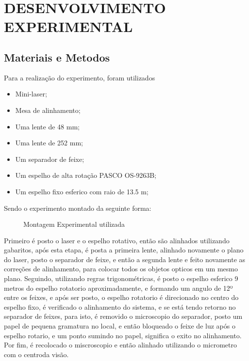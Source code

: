 \section{DESENVOLVIMENTO EXPERIMENTAL}
\subsection{Materiais e Metodos}
Para a realização do experimento, foram utilizados
\begin{itemize}
	\item Mini-laser;
	\item Mesa de alinhamento;
	\item Uma lente de 48 mm;
	\item Uma lente de 252 mm;
	\item Um separador de feixe;
	\item Um espelho de alta rotação PASCO OS-9263B;
	\item Um espelho fixo esferico com raio de 13.5 m;
\end{itemize}
Sendo o experimento montado da seguinte forma:
\begin{figure}[h!]
	\centering
	\caption{Montagem Experimental utilizada}
\end{figure}


Primeiro é posto o laser e o espelho rotativo, então são alinhados
utilizando gabaritos, após esta etapa, é posta a primeira lente,
alinhado novamente o plano do laser, posto o separador de feixe, e
então a segunda lente e feito novamente as correções de alinhamento,
para colocar todos os objetos opticos em um mesmo plano. Seguindo,
utilizando regras trigonométricas, é posto o espelho esferico 9 metros
do espelho rotatorio aproximadamente, e formando um angulo de 12º
entre os feixes, e após ser posto, o espelho rotatorio é direcionado
no centro do espelho fixo, é verificado o alinhamento do sistema, e se
está tendo retorno no separador de feixes, para isto, é removido o
microscopio do separador, posto um papel de pequena gramatura no
local, e então bloqueado o feixe de luz após o espelho rotario, e um
ponto sumindo no papel, significa o exito no alinhamento. Por fim, é
recolocado o miscroscopio e então alinhado utilizando o micrometro com
o centroda visão.
